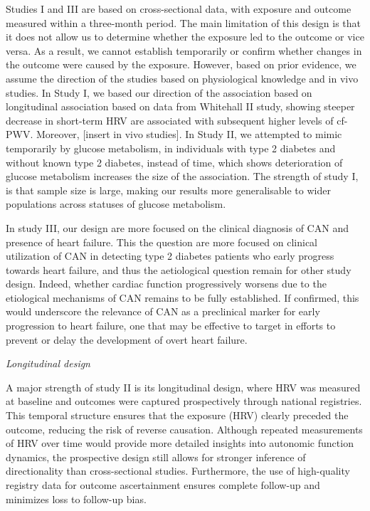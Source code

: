 \documentclass[
  a4paper,
  headsepline=true,
  open=any]{scrbook}
\begin{document}
Studies I and III are based on cross-sectional data, with exposure and
outcome measured within a three-month period. The main limitation of
this design is that it does not allow us to determine whether the
exposure led to the outcome or vice versa. As a result, we cannot
establish temporarily or confirm whether changes in the outcome were
caused by the exposure. However, based on prior evidence, we assume the
direction of the studies based on physiological knowledge and in vivo
studies. In Study I, we based our direction of the association based on
longitudinal association based on data from Whitehall II study, showing
steeper decrease in short-term HRV are associated with subsequent higher
levels of cf-PWV. Moreover, {[}insert in vivo studies{]}. In Study II,
we attempted to mimic temporarily by glucose metabolism, in individuals
with type 2 diabetes and without known type 2 diabetes, instead of time,
which shows deterioration of glucose metabolism increases the size of
the association. The strength of study I, is that sample size is large,
making our results more generalisable to wider populations across
statuses of glucose metabolism.

In study III, our design are more focused on the clinical diagnosis of
CAN and presence of heart failure. This the question are more focused on
clinical utilization of CAN in detecting type 2 diabetes patients who
early progress towards heart failure, and thus the aetiological question
remain for other study design. Indeed, whether cardiac function
progressively worsens due to the etiological mechanisms of CAN remains
to be fully established. If confirmed, this would underscore the
relevance of CAN as a preclinical marker for early progression to heart
failure, one that may be effective to target in efforts to prevent or
delay the development of overt heart failure.

\emph{Longitudinal design}

A major strength of study II is its longitudinal design, where HRV was
measured at baseline and outcomes were captured prospectively through
national registries. This temporal structure ensures that the exposure
(HRV) clearly preceded the outcome, reducing the risk of reverse
causation. Although repeated measurements of HRV over time would provide
more detailed insights into autonomic function dynamics, the prospective
design still allows for stronger inference of directionality than
cross-sectional studies. Furthermore, the use of high-quality registry
data for outcome ascertainment ensures complete follow-up and minimizes
loss to follow-up bias.
\end{document}
